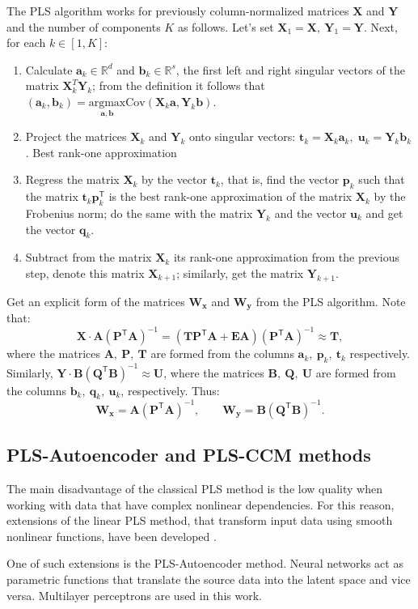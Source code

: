 \documentclass[bst/sn-mathphys]{sn-jnl}%
\newcommand{\bx}{\ensuremath{\mathbf{x}}}
\newcommand{\by}{\mathbf{y}}
\newcommand{\ba}{\mathbf{a}}
\newcommand{\bb}{\mathbf{b}}
\newcommand{\bp}{\mathbf{p}}
\newcommand{\bq}{\mathbf{q}}
\newcommand{\bt}{\mathbf{t}}
\newcommand{\bu}{\mathbf{u}}
\newcommand{\bT}{\mathbf{T}}
\newcommand{\bX}{\mathbf{X}}
\newcommand{\bW}{\mathbf{W}}
\newcommand{\bY}{\mathbf{Y}}
\newcommand{\bU}{\mathbf{U}}
\newcommand{\bQ}{\mathbf{Q}}
\newcommand{\bP}{\mathbf{P}}
\newcommand{\bA}{\mathbf{A}}
\newcommand{\bB}{\mathbf{B}}
\newcommand{\bE}{\mathbf{E}}
\newcommand{\dR}{\mathbb{R}}
\renewcommand{\T}{^{\mathsf{T}}}
\theoremstyle{thmstyleone}%
\theoremstyle{thmstyletwo}%
\theoremstyle{thmstylethree}%
\begin{document}
The PLS algorithm works for previously column-normalized matrices $\bX$ and $\bY$ and the number of components $K$ as follows.
Let's set $\bX_1 = \bX, \: \bY_1 = \bY$.
Next, for each $k \in [1, K]$:
\begin{enumerate}
	\item Calculate $\ba_k\in \dR^d$ and $\bb_k\in \dR^s$, the first left and right singular vectors of the matrix $\bX_k^T\bY_k$; from the definition it follows that $(\ba_k, \bb_k) = \underset{\ba, \bb}{\text{argmax}} \text{Cov} (\bX_k \ba, \bY_k \bb)$.
	\item Project the matrices $\bX_k$ and $\bY_k$ onto singular vectors: $\bt_k = \bX_k \ba_k, \; \bu_k = \bY_k\bb_k$.
	Best rank-one approximation
	\item Regress the matrix $\bX_k$ by the vector $\bt_k$, that is, find the vector $\bp_k$ such that the matrix $\bt_k\bp_k\T$ is the best rank-one approximation of the matrix $\bX_k$ by the Frobenius norm; do the same with the matrix $\bY_k$ and the vector $\bu_k$ and get the vector $\bq_k$.
	\item Subtract from the matrix $\bX_k$ its rank-one approximation from the previous step, denote this matrix $\bX_{k+1}$; similarly, get the matrix $\bY_{k+1}$.
\end{enumerate}

Get an explicit form of the matrices $\bW_{\bx}$ and $\bW_{\by}$ from the PLS algorithm. Note that:
$$\bX\cdot\bA(\bP\T\bA)^{-1} = (\bT\bP\T\bA + \bE\bA)(\bP \T \bA)^{-1} \approx\bT, $$
where the matrices $\bA, \:\bP, \:\bT$ are formed from the columns $\ba_k, \:\bp_k, \:\bt_k$ respectively. 
Similarly, $\bY\cdot\bB(\bQ\T\bB)^{-1} \approx \bU$, where the matrices $\bB, \:\bQ, \:\bU$ are formed from the columns $\bb_k, \:\bq_k, \: \bu_k$, respectively.
Thus:
$$\bW_{\bx} = \bA(\bP\T\bA)^{-1}, \qquad\bW_{\by}= \bB(\bQ\T\bB)^{-1}. $$

\subsection{PLS-Autoencoder and PLS-CCM methods}
The main disadvantage of the classical PLS method is the low quality when working with data that have complex nonlinear dependencies.
For this reason, extensions of the linear PLS method, that transform input data using smooth nonlinear functions, have been developed .

One of such extensions is the PLS-Autoencoder method.
Neural networks act as parametric functions that translate the source data into the latent space and vice versa.
Multilayer perceptrons are used in this work.
\end{document}
